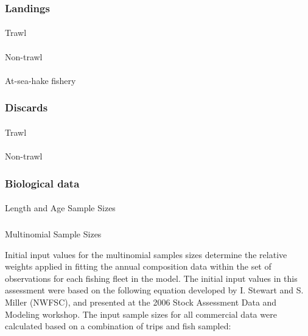 \documentclass[
]{scrartcl}
\makeatletter
\let\oldparagraph\paragraph
\renewcommand{\paragraph}{
    \@ifstar
      \xxxParagraphStar
      \xxxParagraphNoStar
  }
\newcommand{\xxxParagraphStar}[1]{\oldparagraph*{#1}\mbox{}}
\newcommand{\xxxParagraphNoStar}[1]{\oldparagraph{#1}\mbox{}}
\let\oldsubparagraph\subparagraph
\renewcommand{\subparagraph}{
    \@ifstar
      \xxxSubParagraphStar
      \xxxSubParagraphNoStar
  }
\newcommand{\xxxSubParagraphStar}[1]{\oldsubparagraph*{#1}\mbox{}}
\newcommand{\xxxSubParagraphNoStar}[1]{\oldsubparagraph{#1}\mbox{}}
\makeatother
\begin{document}
\subsubsection{Landings}\label{landings}

\paragraph{Trawl}\label{trawl}

\paragraph{Non-trawl}\label{non-trawl}

\paragraph{At-sea-hake fishery}\label{at-sea-hake-fishery}

\subsubsection{Discards}\label{discards}

\paragraph{Trawl}\label{trawl-1}

\paragraph{Non-trawl}\label{non-trawl-1}

\subsubsection{Biological data}\label{biological-data}

\paragraph{Length and Age Sample
Sizes}\label{length-and-age-sample-sizes}

\subparagraph{Multinomial Sample Sizes}\label{multinomial-sample-sizes}

Initial input values for the multinomial samples sizes determine the
relative weights applied in fitting the annual composition data within
the set of observations for each fishing fleet in the model. The initial
input values in this assessment were based on the following equation
developed by I. Stewart and S. Miller (NWFSC), and presented at the 2006
Stock Assessment Data and Modeling workshop. The input sample sizes for
all commercial data were calculated based on a combination of trips and
fish sampled:
\end{document}
